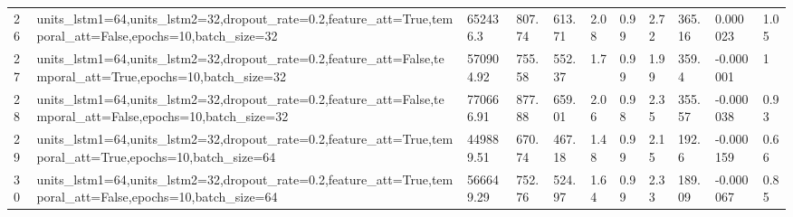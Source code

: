 \begin{longtable}{C{0.8cm} L{2cm} C{1.15cm} C{1.15cm} C{1.15cm} C{1.15cm} C{0.85cm} C{1.25cm} C{1.2cm} C{1.5cm} C{1.0cm}}
26 & units\_lstm1=64,\newline units\_lstm2=32,\newline dropout\_rate=0.2,\newline feature\_att=True,\newline temporal\_att=False,\newline epochs=10,\newline batch\_size=32 & 652436.3 & 807.74 & 613.71 & 2.08 & 0.99 & 2.72 & 365.16 & 0.000023 & 1.05 \\
27 & units\_lstm1=64,\newline units\_lstm2=32,\newline dropout\_rate=0.2,\newline feature\_att=False,\newline temporal\_att=True,\newline epochs=10,\newline batch\_size=32 & 570904.92 & 755.58 & 552.37 & 1.7 & 0.99 & 1.99 & 359.4 & -0.000001 & 1 \\
28 & units\_lstm1=64,\newline units\_lstm2=32,\newline dropout\_rate=0.2,\newline feature\_att=False,\newline temporal\_att=False,\newline epochs=10,\newline batch\_size=32 & 770666.91 & 877.88 & 659.01 & 2.06 & 0.98 & 2.35 & 355.57 & -0.000038 & 0.93 \\
29 & units\_lstm1=64,\newline units\_lstm2=32,\newline dropout\_rate=0.2,\newline feature\_att=True,\newline temporal\_att=True,\newline epochs=10,\newline batch\_size=64 & 449889.51 & 670.74 & 467.18 & 1.48 & 0.99 & 2.15 & 192.6 & -0.000159 & 0.66 \\
30 & units\_lstm1=64,\newline units\_lstm2=32,\newline dropout\_rate=0.2,\newline feature\_att=True,\newline temporal\_att=False,\newline epochs=10,\newline batch\_size=64 & 566649.29 & 752.76 & 524.97 & 1.64 & 0.99 & 2.33 & 189.09 & -0.000067 & 0.85 \\

\end{longtable}
